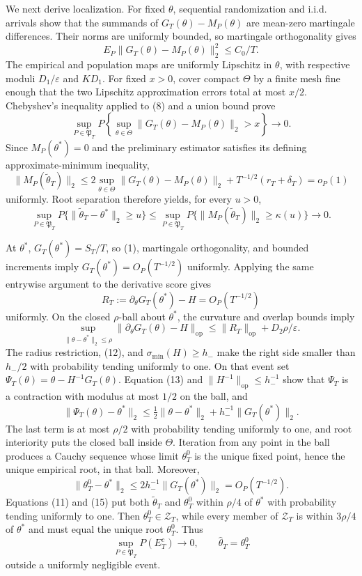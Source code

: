 We next derive localization. For fixed \(\theta\), sequential randomization and i.i.d. arrivals show that the summands of \(G_T(\theta)-M_P(\theta)\) are mean-zero martingale differences. Their norms are uniformly bounded, so martingale orthogonality gives
\[
 E_P\|G_T(\theta)-M_P(\theta)\|_2^2\le C_0/T. \tag{8}
\]
The empirical and population maps are uniformly Lipschitz in \(\theta\), with respective moduli \(D_1/\varepsilon\) and \(KD_1\). For fixed \(x>0\), cover compact \(\Theta\) by a finite mesh fine enough that the two Lipschitz approximation errors total at most \(x/2\). Chebyshev's inequality applied to (8) and a union bound prove
\[
 \sup_{P\in\mathfrak P_T}P\left\{\sup_{\theta\in\Theta}
 \|G_T(\theta)-M_P(\theta)\|_2>x\right\}\longrightarrow0. \tag{9}
\]
Since \(M_P(\theta^*)=0\) and the preliminary estimator satisfies its defining approximate-minimum inequality,
\[
 \|M_P(\widetilde\theta_T)\|_2
 \le2\sup_{\theta\in\Theta}\|G_T(\theta)-M_P(\theta)\|_2
 +T^{-1/2}(r_T+\delta_T)=o_P(1) \tag{10}
\]
uniformly. Root separation therefore yields, for every \(u>0\),
\[
 \sup_{P\in\mathfrak P_T}P\{\|\widetilde\theta_T-\theta^*\|_2\ge u\}
 \le\sup_{P\in\mathfrak P_T}P\{\|M_P(\widetilde\theta_T)\|_2\ge\kappa(u)\}
 \longrightarrow0. \tag{11}
\]

At \(\theta^*\), \(G_T(\theta^*)=S_T/T\), so (1), martingale orthogonality, and bounded increments imply \(G_T(\theta^*)=O_P(T^{-1/2})\) uniformly. Applying the same entrywise argument to the derivative score gives
\[
 R_T:=\partial_\theta G_T(\theta^*)-H=O_P(T^{-1/2}) \tag{12}
\]
uniformly. On the closed \(\rho\)-ball about \(\theta^*\), the curvature and overlap bounds imply
\[
 \sup_{\|\theta-\theta^*\|_2\le\rho}
 \|\partial_\theta G_T(\theta)-H\|_{\mathrm{op}}
 \le\|R_T\|_{\mathrm{op}}+D_2\rho/\varepsilon. \tag{13}
\]
The radius restriction, (12), and \(\sigma_{\min}(H)\ge h_-\) make the right side smaller than \(h_-/2\) with probability tending uniformly to one. On that event set \(\Psi_T(\theta)=\theta-H^{-1}G_T(\theta)\). Equation (13) and \(\|H^{-1}\|_{\mathrm{op}}\le h_-^{-1}\) show that \(\Psi_T\) is a contraction with modulus at most \(1/2\) on the ball, and
\[
 \|\Psi_T(\theta)-\theta^*\|_2
 \le\tfrac12\|\theta-\theta^*\|_2+h_-^{-1}\|G_T(\theta^*)\|_2. \tag{14}
\]
The last term is at most \(\rho/2\) with probability tending uniformly to one, and root interiority puts the closed ball inside \(\Theta\). Iteration from any point in the ball produces a Cauchy sequence whose limit \(\theta_T^0\) is the unique fixed point, hence the unique empirical root, in that ball. Moreover,
\[
 \|\theta_T^0-\theta^*\|_2
 \le2h_-^{-1}\|G_T(\theta^*)\|_2=O_P(T^{-1/2}). \tag{15}
\]
Equations (11) and (15) put both \(\widetilde\theta_T\) and \(\theta_T^0\) within \(\rho/4\) of \(\theta^*\) with probability tending uniformly to one. Then \(\theta_T^0\in\mathcal Z_T\), while every member of \(\mathcal Z_T\) is within \(3\rho/4\) of \(\theta^*\) and must equal the unique root \(\theta_T^0\). Thus
\[
 \sup_{P\in\mathfrak P_T}P(E_T^c)\to0,
 \qquad \widehat\theta_T=\theta_T^0
\]
outside a uniformly negligible event.

